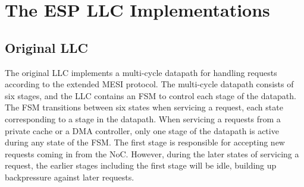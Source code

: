 \section{The ESP LLC Implementations}
\label{sec:llcImplementations}
\subsection{Original LLC}
The original LLC implements a multi-cycle datapath for handling requests according to the extended MESI protocol. The multi-cycle datapath consists of six stages, and the LLC contains an FSM to control each stage of the datapath.
The FSM transitions between six states when servicing a request, each state corresponding to a stage in the datapath. 
When servicing a requests from a private cache or a DMA controller, only one stage of the datapath is active during any state of the FSM. The first stage is responsible for accepting 
new requests coming in from the NoC. However, during the later states of servicing a request, the earlier stages including the first stage will be idle, building up backpressure against later requests.
